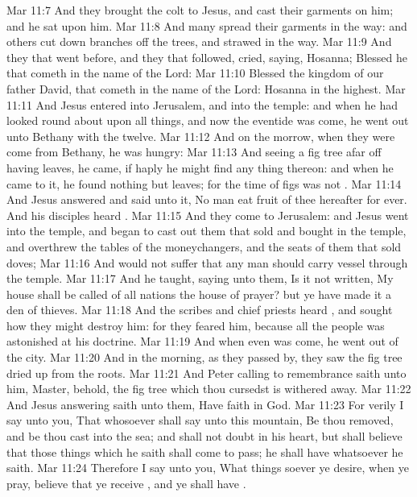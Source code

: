 \vs Mar 11:7 And they brought the colt to Jesus, and cast their garments on him; and he sat upon him.
\vs Mar 11:8 And many spread their garments in the way: and others cut down branches off the trees, and strawed  in the way.
\vs Mar 11:9 And they that went before, and they that followed, cried, saying, Hosanna; Blessed  he that cometh in the name of the Lord:
\vs Mar 11:10 Blessed  the kingdom of our father David, that cometh in the name of the Lord: Hosanna in the highest.
\vs Mar 11:11 And Jesus entered into Jerusalem, and into the temple: and when he had looked round about upon all things, and now the eventide was come, he went out unto Bethany with the twelve.
\vs Mar 11:12 And on the morrow, when they were come from Bethany, he was hungry:
\vs Mar 11:13 And seeing a fig tree afar off having leaves, he came, if haply he might find any thing thereon: and when he came to it, he found nothing but leaves; for the time of figs was not .
\vs Mar 11:14 And Jesus answered and said unto it, No man eat fruit of thee hereafter for ever. And his disciples heard .
\vs Mar 11:15 And they come to Jerusalem: and Jesus went into the temple, and began to cast out them that sold and bought in the temple, and overthrew the tables of the moneychangers, and the seats of them that sold doves;
\vs Mar 11:16 And would not suffer that any man should carry  vessel through the temple.
\vs Mar 11:17 And he taught, saying unto them, Is it not written, My house shall be called of all nations the house of prayer? but ye have made it a den of thieves.
\vs Mar 11:18 And the scribes and chief priests heard , and sought how they might destroy him: for they feared him, because all the people was astonished at his doctrine.
\vs Mar 11:19 And when even was come, he went out of the city.
\vs Mar 11:20 And in the morning, as they passed by, they saw the fig tree dried up from the roots.
\vs Mar 11:21 And Peter calling to remembrance saith unto him, Master, behold, the fig tree which thou cursedst is withered away.
\vs Mar 11:22 And Jesus answering saith unto them, Have faith in God.
\vs Mar 11:23 For verily I say unto you, That whosoever shall say unto this mountain, Be thou removed, and be thou cast into the sea; and shall not doubt in his heart, but shall believe that those things which he saith shall come to pass; he shall have whatsoever he saith.
\vs Mar 11:24 Therefore I say unto you, What things soever ye desire, when ye pray, believe that ye receive , and ye shall have .
